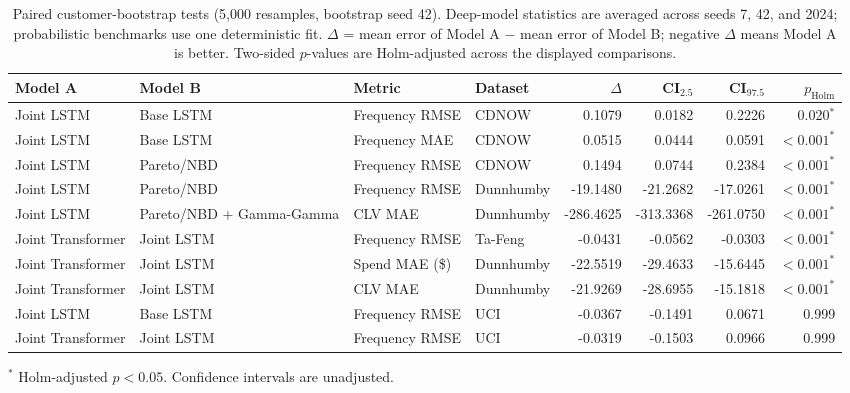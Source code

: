 \begin{table}[htbp]
\centering
\small
\begin{threeparttable}
\caption{Paired customer-bootstrap tests (5{,}000 resamples, bootstrap seed 42). Deep-model statistics are averaged across seeds 7, 42, and 2024; probabilistic benchmarks use one deterministic fit. $\Delta$ = mean error of Model A $-$ mean error of Model B; negative $\Delta$ means Model A is better. Two-sided $p$-values are Holm-adjusted across the displayed comparisons.}
\label{tab:significance}
\begin{tabular}{llllrrrr}
\toprule
Model A & Model B & Metric & Dataset & $\Delta$ & CI$_{2.5}$ & CI$_{97.5}$ & $p_{\mathrm{Holm}}$ \\
\midrule
Joint LSTM & Base LSTM & Frequency RMSE & CDNOW & 0.1079 & 0.0182 & 0.2226 & 0.020$^{*}$ \\
Joint LSTM & Base LSTM & Frequency MAE & CDNOW & 0.0515 & 0.0444 & 0.0591 & $<0.001^{*}$ \\
Joint LSTM & Pareto/NBD & Frequency RMSE & CDNOW & 0.1494 & 0.0744 & 0.2384 & $<0.001^{*}$ \\
Joint LSTM & Pareto/NBD & Frequency RMSE & Dunnhumby & -19.1480 & -21.2682 & -17.0261 & $<0.001^{*}$ \\
Joint LSTM & Pareto/NBD + Gamma-Gamma & CLV MAE & Dunnhumby & -286.4625 & -313.3368 & -261.0750 & $<0.001^{*}$ \\
Joint Transformer & Joint LSTM & Frequency RMSE & Ta-Feng & -0.0431 & -0.0562 & -0.0303 & $<0.001^{*}$ \\
Joint Transformer & Joint LSTM & Spend MAE (\$) & Dunnhumby & -22.5519 & -29.4633 & -15.6445 & $<0.001^{*}$ \\
Joint Transformer & Joint LSTM & CLV MAE & Dunnhumby & -21.9269 & -28.6955 & -15.1818 & $<0.001^{*}$ \\
Joint LSTM & Base LSTM & Frequency RMSE & UCI & -0.0367 & -0.1491 & 0.0671 & 0.999 \\
Joint Transformer & Joint LSTM & Frequency RMSE & UCI & -0.0319 & -0.1503 & 0.0966 & 0.999 \\
\bottomrule
\end{tabular}
\begin{tablenotes}\footnotesize
\item[$^*$] Holm-adjusted $p < 0.05$. Confidence intervals are unadjusted.
\end{tablenotes}
\end{threeparttable}
\end{table}